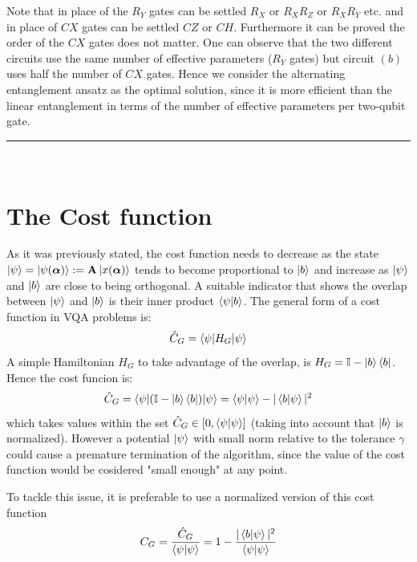 \documentclass[12pt]{article}
\begin{document}
Note that in place of the $R_Y$ gates can be settled $R_X$ or $R_XR_Z$ or $R_XR_Y$ etc. and in place of $CX$ gates can be settled $CZ$ or $CH$. Furthermore it can be proved the order of the $CX$ gates does not matter.
One can observe that the two different circuits use the same number of effective parameters ($R_Y$ gates) but circuit $(b)$ uses half the number of $CX$ gates. Hence we consider the alternating entanglement 
ansatz as the optimal solution, since it is more efficient than the linear entanglement in terms of the number of effective parameters per two-qubit gate.\\
\rule{\textwidth}{.5pt}\\
\section*{{\bf The Cost function}}
As it was previously stated, the cost function needs to decrease as the state $\left\vert{\psi}\right\rangle = \left\vert{\psi(\boldsymbol{\alpha})}\right\rangle:={\bf A}\left\vert{x(\boldsymbol{\alpha})}\right\rangle$ tends to become proportional to $\left\vert{b}\right\rangle$ and increase as $\left\vert{\psi}\right\rangle$ and $\left\vert{b}\right\rangle$ are close to being orthogonal.
A suitable indicator that shows the overlap between $\left\vert{\psi}\right\rangle$ and $\left\vert{b}\right\rangle$ is their inner product $\braket{\psi|b}$. The general form of a cost function in VQA problems is: 
$$\hat{C}_G  = \braket{\psi|H_G|\psi}$$
A simple Hamiltonian $H_G$ to take advantage of the overlap, is $H_G=\mathbb{I} -\left\vert{b}\right\rangle\left\langle{b}\right\vert$. Hence the cost funcion is:
$$\hat{C}_G  = \braket{\psi|(\mathbb{I} -\left\vert{b}\right\rangle\left\langle{b}\right\vert)|\psi}=\braket{\psi|\psi} - |\braket{b|\psi}|^2$$
which takes values within the set $\hat{C}_G \in [0,\braket{\psi|\psi}]$ (taking into account that $\left\vert{b}\right\rangle$ is normalized). However a potential $\left\vert{\psi}\right\rangle$ with small norm relative to the tolerance $\gamma$ 
could cause a premature termination of the algorithm, since the value of the cost function would be cosidered "small enough" at any point.

To tackle this issue, it is preferable to use a normalized version of this cost function 
$$C_G = \frac{\hat{C}_G}{\braket{\psi|\psi}}=1 - \frac{|\braket{b|\psi}|^2}{\braket{\psi|\psi}} $$
\end{document}
